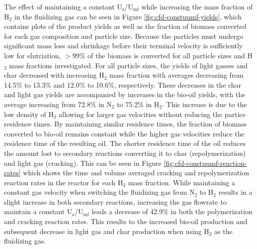 \documentclass{article}
\begin{document}
The effect of maintaining a constant U$_\text{s}$/U$_\text{mf}$ while increasing the mass fraction of H$_2$ in the fluidizing gas can be seen in Figure \ref{fig:cfd-constuumf-yields}, which contains plots of the product yields as well as the fraction of biomass converted for each gas composition and particle size. Because the particles must undergo significant mass loss and shrinkage before their terminal velocity is sufficiently low for elutriation, $>$99\% of the biomass is converted for all particle sizes and H$_2$ mass fractions investigated. For all particle sizes, the yields of light gasses and char decreased with increasing H$_2$ mass fraction with averages decreasing from 14.5\% to 13.3\% and 12.0\% to 10.6\%, respectively. These decreases in the char and light gas yields are accompanied by increases in the bio-oil yields, with the average increasing from 72.8\% in N$_2$ to 75.2\% in H$_2$. This increase is due to the low density of H$_2$ allowing for larger gas velocities without reducing the partice residence times. By maintaining similar residence times, the fraction of biomass converted to bio-oil remains constant while the higher gas velocities reduce the residence time of the resulting oil. The shorter residence time of the oil reduces the amount lost to secondary reactions converting it to char (repolymerization) and light gas (cracking). This can be seen in Figure \ref{fig:cfd-constuumf-reaction-rates} which shows the time and volume averaged cracking and repolymerization reaction rates in the reactor for each H$_2$ mass fraction. While maintaining a constant gas velocity when switching the fluidizing gas from N$_2$ to H$_2$ results in a slight increase in both secondary reactions, increasing the gas flowrate to maintain a constant U$_\text{s}$/U$_\text{mf}$ leads a decrease of 42.9\% in both the polymerization and cracking reaction rates. This results to the increased bio-oil production and subsequent decrease in light gas and char production when using H$_2$ as the fluidizing gas.
\end{document}

